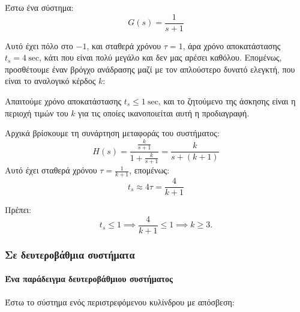 \documentclass[11pt,a4paper,notitlepage,fleqn]{article}
\begin{document}
\begin{exercise}
Έστω ένα σύστημα:
\[
G(s) = \frac{1}{s+1}
\]

Αυτό έχει πόλο στο \( -1 \), και σταθερά χρόνου \( τ = 1 \), άρα χρόνο αποκατάστασης \( t_s = 4\ \mathrm{sec} \),
κάτι που είναι πολύ μεγάλο και δεν μας αρέσει καθόλου. Επομένως, προσθέτουμε έναν βρόγχο ανάδρασης μαζί με τον
απλούστερο δυνατό ελεγκτή, που είναι το αναλογικό κέρδος \( \boxed{k} \):


Απαιτούμε χρόνο αποκατάστασης \( t_s \leq 1\ \mathrm{sec} \), και το ζητούμενο της άσκησης είναι η περιοχή τιμών
του \( k \) για τις οποίες ικανοποιείται αυτή η προδιαγραφή.

\tcblower
Αρχικά βρίσκουμε τη συνάρτηση μεταφοράς του συστήματος:
\[
H(s) = \frac{\frac{k}{s+1}}{1+\frac{k}{s+1}}
= \frac{k}{s+(k+1)}
\]
Αυτό έχει σταθερά χρόνου \( τ = \frac{1}{k+1} \), επομένως:
\[
t_s \approx 4τ = \frac{4}{k+1}
\]

Πρέπει:
\[
t_s \leq 1 \implies \frac{4}{k+1} \leq 1 \implies k \geq 3.
\]

\end{exercise}

\subsubsection{Σε δευτεροβάθμια συστήματα}

\paragraph{Ένα παράδειγμα δευτεροβάθμιου συστήματος}
Έστω το σύστημα ενός περιστρεφόμενου κυλίνδρου με απόσβεση:
\end{document}
